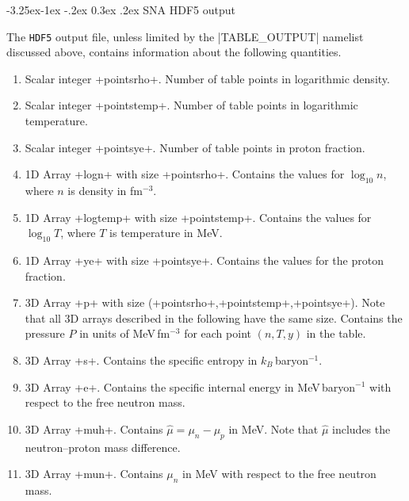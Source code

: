 \documentclass[letterpaper,11pt]{refart}
\makeatletter
\renewcommand\subsubsection{\@startsection{subsubsection}{3}{\z@}%
                           {-3.25ex\@plus -1ex \@minus -.2ex}%
                           {0.3ex \@plus .2ex}%
                           {\normalfont\normalsize\bf\fontsize{11}{13}\selectfont}}
\makeatother
\begin{document}
\subsubsection{SNA HDF5 output}\label{sssec:SNA_HDF5}


The \verb|HDF5| output file, unless limited by the \verbnml|TABLE_OUTPUT| namelist discussed above, contains information about the following quantities.
\begin{enumerate}
 \item Scalar integer \verbprm+pointsrho+. Number of table points in
   logarithmic density.

 \item Scalar integer \verbprm+pointstemp+. Number of table points in
   logarithmic temperature.

 \item Scalar integer \verbprm+pointsye+. Number of table points in
   proton fraction.

 \item 1D Array
   \verbprm+logn+ with size \verbprm+pointsrho+. Contains the values for
   $\log_{10}n$, where $n$ is density in fm$^{-3}$.

 \item 1D Array \verbprm+logtemp+ with size
   \verbprm+pointstemp+. Contains the values for $\log_{10}T$, where
   $T$ is temperature in MeV.

 \item 1D Array \verbprm+ye+ with size \verbprm+pointsye+. Contains
   the values for the proton fraction.
   
 \item 3D Array \verbprm+p+ with size
   (\verbprm+pointsrho+,\verbprm+pointstemp+,\verbprm+pointsye+). Note
   that all 3D arrays described in the following have the same
   size. Contains the pressure $P$ in units of MeV\,fm$^{-3}$ for each
   point $(n,T,y)$ in the table.

 \item 3D Array \verbprm+s+. Contains the specific entropy in
   $k_B$\,baryon$^{-1}$.

 \item 3D Array \verbprm+e+. Contains the specific internal energy in
   MeV\,baryon$^{-1}$ with respect to the free neutron mass.

 \item 3D Array \verbprm+muh+. Contains $\hat\mu=\mu_n-\mu_p$ in MeV. 
   Note that $\hat\mu$ includes the neutron--proton mass difference.
   
 \item 3D Array \verbprm+mun+. Contains $\mu_n$ in MeV with respect to the
   free neutron mass.


\end{enumerate}
\end{document}
